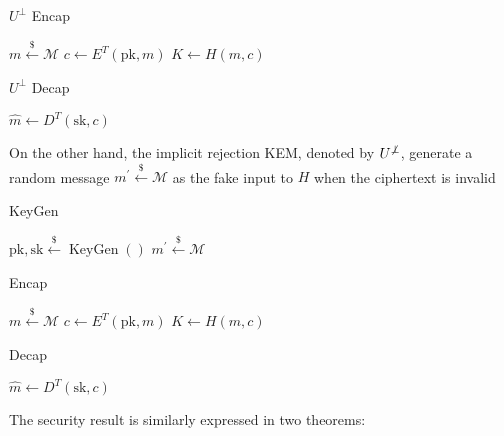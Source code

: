 \documentclass{article}
\newcommand{\leftsample}{\overset{{\scriptscriptstyle\$}}{\leftarrow}}
\begin{document}
\begin{multicols}{2}
    \begin{algorithm}[H]
        \SetAlgoLined
        \caption{$U^\bot$ Encap}
        $m \leftsample \mathcal{M}$\;
        $c \leftarrow E^T(\text{pk}, m)$\;
        $K \leftarrow H(m, c)$ \;
    \end{algorithm}
    \columnbreak

    \begin{algorithm}[H]
        \SetAlgoLined
        \caption{$U^\bot$ Decap}
        $\hat{m} \leftarrow D^T(\text{sk}, c)$\;
    \end{algorithm}
\end{multicols}

On the other hand, the implicit rejection KEM, denoted by $U^{\not\bot}$, generate a random message $m^\prime \leftsample \mathcal{M}$ as the fake input to $H$ when the ciphertext is invalid

\begin{multicols}{3}
    \begin{algorithm}[H]
        \SetAlgoLined
        \caption{KeyGen}
        $\text{pk}, \text{sk} \leftsample \operatorname{KeyGen}()$\;
        $m^\prime \leftsample \mathcal{M}$\;
        \;
    \end{algorithm}
    \columnbreak

    \begin{algorithm}[H]
        \SetAlgoLined
        \caption{Encap}
        $m \leftsample \mathcal{M}$\;
        $c \leftarrow E^T(\text{pk}, m)$\;
        $K \leftarrow H(m, c)$\;
    \end{algorithm}
    \columnbreak

    \begin{algorithm}[H]
        \SetAlgoLined
        \caption{Decap}
        $\hat{m} \leftarrow D^T(\text{sk}, c)$\;
    \end{algorithm}
\end{multicols}

The security result is similarly expressed in two theorems:
\end{document}
